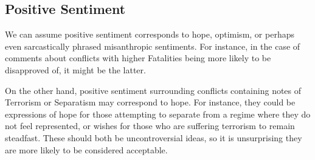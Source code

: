 \subsection{Positive Sentiment}
We can assume positive sentiment corresponds to hope, optimism, or perhaps even sarcastically phrased misanthropic sentiments. For instance, in the case of comments about conflicts with higher Fatalities being more likely to be disapproved of, it might be the latter. 

On the other hand, positive sentiment surrounding conflicts containing notes of Terrorism or Separatism may correspond to hope. For instance, they could be expressions of hope for those attempting to separate from a regime where they do not feel represented, or wishes for those who are suffering terrorism to remain steadfast. These should both be uncontroversial ideas, so it is unsurprising they are more likely to be considered acceptable.
